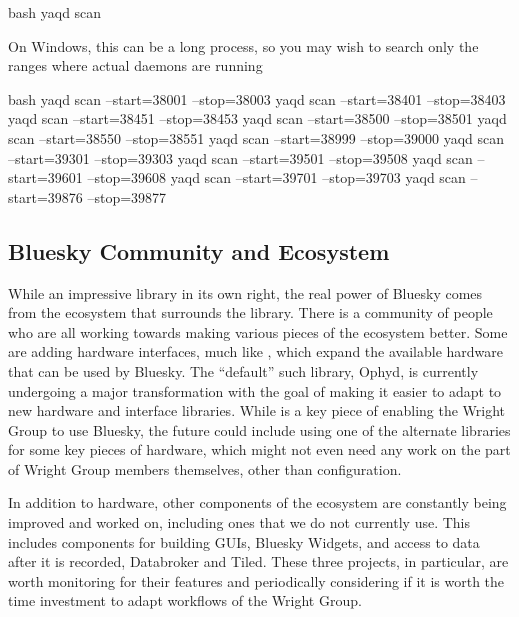 \begin{codefragment}{bash}
yaqd scan
\end{codefragment}

On Windows, this can be a long process, so you may wish to search only the ranges where actual daemons are running

\begin{codefragment}{bash}
yaqd scan --start=38001 --stop=38003
yaqd scan --start=38401 --stop=38403
yaqd scan --start=38451 --stop=38453
yaqd scan --start=38500 --stop=38501
yaqd scan --start=38550 --stop=38551
yaqd scan --start=38999 --stop=39000
yaqd scan --start=39301 --stop=39303
yaqd scan --start=39501 --stop=39508
yaqd scan --start=39601 --stop=39608
yaqd scan --start=39701 --stop=39703
yaqd scan --start=39876 --stop=39877
\end{codefragment}

\subsection{Bluesky Community and Ecosystem}

While an impressive library in its own right, the real power of Bluesky comes from the ecosystem that surrounds the library.
There is a community of people who are all working towards making various pieces of the ecosystem better.
Some are adding hardware interfaces, much like \yaqcbluesky{}, which expand the available hardware that can be used by Bluesky.
The ``default'' such library, Ophyd\cite{Lauer2020}, is currently undergoing a major transformation with the goal of making it easier to adapt to new hardware and interface libraries\cite{NOBUGS_Ophyd_v2}.
While \yaq{} is a key piece of enabling the Wright Group to use Bluesky, the future could include using one of the alternate libraries for some key pieces of hardware, which might not even need any work on the part of Wright Group members themselves, other than configuration.

In addition to hardware, other components of the ecosystem are constantly being improved and worked on, including ones that we do not currently use.
This includes components for building GUIs, Bluesky Widgets, and access to data after it is recorded, Databroker and Tiled.
These three projects, in particular, are worth monitoring for their features and periodically considering if it is worth the time investment to adapt workflows of the Wright Group.

